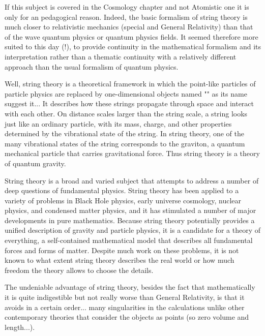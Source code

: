 	\begin{tcolorbox}[title=Remark,colframe=black,arc=10pt]
	If this subject is covered in the Cosmology chapter and not Atomistic one it is only for an pedagogical reason. Indeed, the basic formalism of string theory is much closer to relativistic mechanics (special and General Relativity) than that of the wave quantum physics or quantum physics fields. It seemed therefore more suited to this day (!), to provide continuity in the mathematical formalism and its interpretation rather than a thematic continuity with a relatively different approach than the usual formalism of quantum physics.
	\end{tcolorbox}
	Well, string theory is a theoretical framework in which the point-like particles of particle physics are replaced by one-dimensional objects named "" as its name suggest it... It describes how these strings propagate through space and interact with each other. On distance scales larger than the string scale, a string looks just like an ordinary particle, with its mass, charge, and other properties determined by the vibrational state of the string. In string theory, one of the many vibrational states of the string corresponds to the graviton, a quantum mechanical particle that carries gravitational force. Thus string theory is a theory of quantum gravity.

	String theory is a broad and varied subject that attempts to address a number of deep questions of fundamental physics. String theory has been applied to a variety of problems in Black Hole physics, early universe cosmology, nuclear physics, and condensed matter physics, and it has stimulated a number of major developments in pure mathematics. Because string theory potentially provides a unified description of gravity and particle physics, it is a candidate for a theory of everything, a self-contained mathematical model that describes all fundamental forces and forms of matter. Despite much work on these problems, it is not known to what extent string theory describes the real world or how much freedom the theory allows to choose the details.
	
	The undeniable advantage of string theory, besides the fact that mathematically it is quite indigestible but not really worse than General Relativity, is that it avoids in a certain order... many singularities in the calculations unlike other contemporary theories that consider the objects as points (so zero volume and length...).
	
